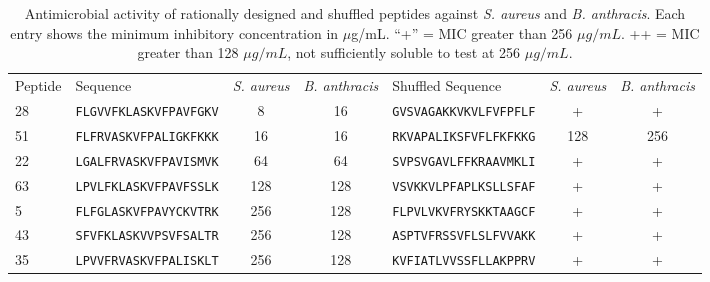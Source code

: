 \begin{table}[ptbh]
    \caption[Antimicrobial activity of rationally designed and shuffled peptides against
        \emph{S. aureus} and \emph{B. anthracis}]{Antimicrobial activity of rationally designed and shuffled peptides against
        \emph{S. aureus} and \emph{B. anthracis}.
    Each entry shows the minimum inhibitory concentration in $\mu$g/mL\@.   ``+'' = MIC greater than 256 $\mu g/mL$.  ++ = MIC
greater than 128 $\mu g/mL$, not sufficiently soluble to test at 256
$\mu g/mL$.}
            \label{table:chrisResults2}
                    \centering \scriptsize
            \begin{tabular}{llcclcc} \hline\hline
Peptide &  Sequence  &  \emph{S. aureus}  &  \emph{B. anthracis}   &  Shuffled Sequence  &  \emph{S. aureus}  &  \emph{B. anthracis} \\
\rowcolor[gray]{0.9}
28  &  \texttt{FLGVVFKLASKVFPAVFGKV}  &  8  &  16  & \texttt{GVSVAGAKKVKVLFVFPFLF}  &  +  &  + \\
51  &  \texttt{FLFRVASKVFPALIGKFKKK}  &  16  &  16  & \texttt{RKVAPALIKSFVFLFKFKKG}  &  128  &  256 \\
\rowcolor[gray]{0.9}
22  &  \texttt{LGALFRVASKVFPAVISMVK}  &  64  &  64  & \texttt{SVPSVGAVLFFKRAAVMKLI}  &  +  &  + \\
63  &  \texttt{LPVLFKLASKVFPAVFSSLK}  &  128  &  128  & \texttt{VSVKKVLPFAPLKSLLSFAF}  &  +  &  + \\
\rowcolor[gray]{0.9}
5  &  \texttt{FLFGLASKVFPAVYCKVTRK}  &  256  &  128  & \texttt{FLPVLVKVFRYSKKTAAGCF}  &  +  &  + \\
43  &  \texttt{SFVFKLASKVVPSVFSALTR}  &  256  &  128  & \texttt{ASPTVFRSSVFLSLFVVAKK}  &  +  &  + \\
\rowcolor[gray]{0.9}
35  &  \texttt{LPVVFRVASKVFPALISKLT}  &  256  &  128  & \texttt{KVFIATLVVSSFLLAKPPRV}  &  +  &  + \\
\hline\hline
\end{tabular}
\end{table}
